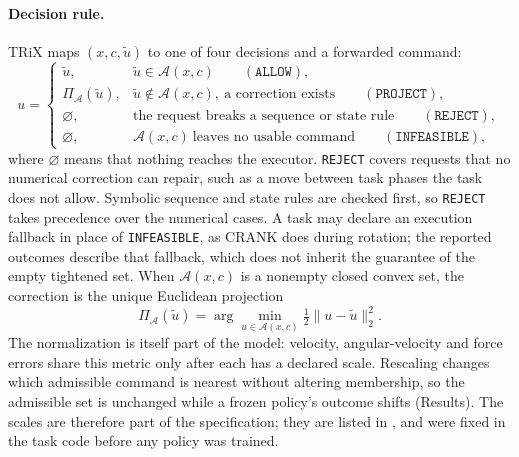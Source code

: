 \documentclass[12pt]{article}
\begin{document}
\paragraph{Decision rule.} TRiX maps $(x,c,\tilde u)$ to one of four decisions
and a forwarded command:
\begin{equation}
u=\begin{cases}
\tilde u, & \tilde u\in\mathcal A(x,c) \qquad (\texttt{ALLOW}),\\[2pt]
\Pi_{\mathcal A}(\tilde u), & \tilde u\notin\mathcal A(x,c),\ \text{a correction exists} \qquad (\texttt{PROJECT}),\\[2pt]
\varnothing, & \text{the request breaks a sequence or state rule} \qquad (\texttt{REJECT}),\\[2pt]
\varnothing, & \mathcal A(x,c)\ \text{leaves no usable command} \qquad (\texttt{INFEASIBLE}),
\end{cases}
\label{eq:contract}
\end{equation}
where $\varnothing$ means that nothing reaches the executor. \texttt{REJECT}
covers requests that no numerical correction can repair, such as a move between
task phases the task does not allow. Symbolic sequence and state rules are
checked first, so \texttt{REJECT} takes precedence over the numerical cases. A task may declare an execution fallback in
place of \texttt{INFEASIBLE}, as CRANK does during rotation; the reported outcomes describe that fallback,
which does not inherit the guarantee of the empty tightened set. When $\mathcal A(x,c)$ is a nonempty
closed convex set, the correction is the unique Euclidean projection
\begin{equation}
\Pi_{\mathcal A}(\tilde u)=\arg\min_{u\in\mathcal A(x,c)}
\tfrac12\|u-\tilde u\|_2^2.
\label{eq:projection}
\end{equation}
The normalization is itself part of the model: velocity, angular-velocity and
force errors share this metric only after each has a declared scale. Rescaling
changes which admissible command is nearest without altering membership, so the
admissible set is unchanged while a frozen policy's outcome shifts (Results). The scales are therefore part of the
specification; they are listed in , and were fixed in the task
code before any policy was trained.
\end{document}
